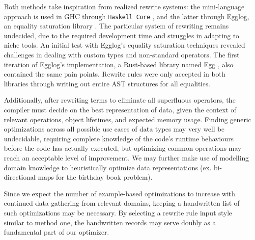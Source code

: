 \documentclass{article}
\begin{document}
Both methods take inspiration from realized rewrite systems: the mini-language approach is used in GHC through \texttt{Haskell Core} \cite{haskellCore}, and the latter through Egglog, an equality saturation library \cite{egglogPython, eggPaper}. The particular system of rewriting remains undecided, due to the required development time and struggles in adapting to niche tools. An initial test with Egglog's equality saturation techniques revealed challenges in dealing with custom types and non-standard operators. The first iteration of Egglog's implementation, a Rust-based library named Egg \cite{eggRust}, also contained the same pain points. Rewrite rules were only accepted in both libraries through writing out entire AST structures for all equalities.

Additionally, after rewriting terms to eliminate all superfluous operators, the compiler must decide on the best representation of data, given the context of relevant operations, object lifetimes, and expected memory usage. Finding generic optimizations across all possible use cases of data types may very well be undecidable, requiring complete knowledge of the code's runtime behaviours before the code has actually executed, but optimizing common operations may reach an acceptable level of improvement. We may further make use of modelling domain knowledge to heuristically optimize data representations (ex. bi-directional maps for the birthday book problem).



Since we expect the number of example-based optimizations to increase with continued data gathering from relevant domains, keeping a handwritten list of such optimizations may be necessary. By selecting a rewrite rule input style similar to method one, the handwritten records may serve doubly as a fundamental part of our optimizer.
\end{document}

